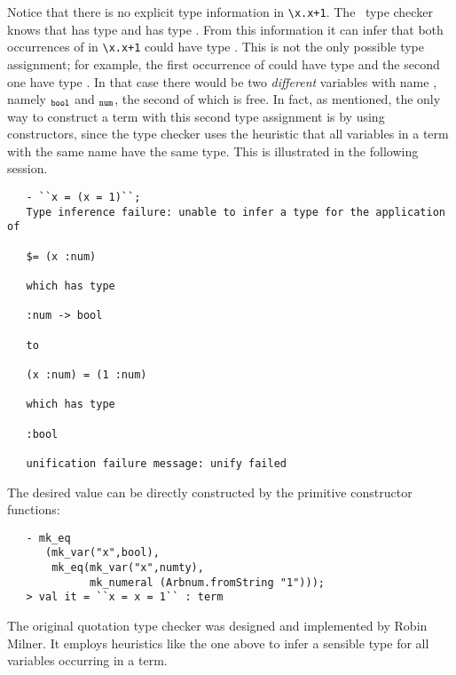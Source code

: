 
Notice that there is no explicit type information in
\verb!\x.x+1!.  The \HOL\ type checker knows that  has
type  and \ml{+} has type .  From this
information it can infer that both occurrences of  in
\verb!\x.x+1! could have type .  This is not the only possible
type assignment; for example, the first occurrence of  could
have type  and the second one have type .  In that
case there would be two \emph{different} variables with name
, namely $_{\tt bool}$ and
$_{\tt num}$, the second of which is free.  In fact,
as mentioned, the only way to construct a term with this second type
assignment is by using constructors, since the type checker uses the
heuristic that all variables in a term with the same name have the
same type.  This is illustrated in the following session.

\setcounter{sessioncount}{1}
\begin{session}
\begin{verbatim}
   - ``x = (x = 1)``;
   Type inference failure: unable to infer a type for the application of

   $= (x :num)

   which has type

   :num -> bool

   to

   (x :num) = (1 :num)

   which has type

   :bool

   unification failure message: unify failed
\end{verbatim}
\end{session}

The desired value can be directly constructed by the primitive constructor
functions:

\begin{session}
\begin{verbatim}
   - mk_eq
      (mk_var("x",bool),
       mk_eq(mk_var("x",numty),
             mk_numeral (Arbnum.fromString "1")));
   > val it = ``x = x = 1`` : term
\end{verbatim}
\end{session}

The original quotation type checker was designed and implemented by
Robin Milner.  It employs heuristics like the one
above to infer a sensible type for all variables occurring in a term.

